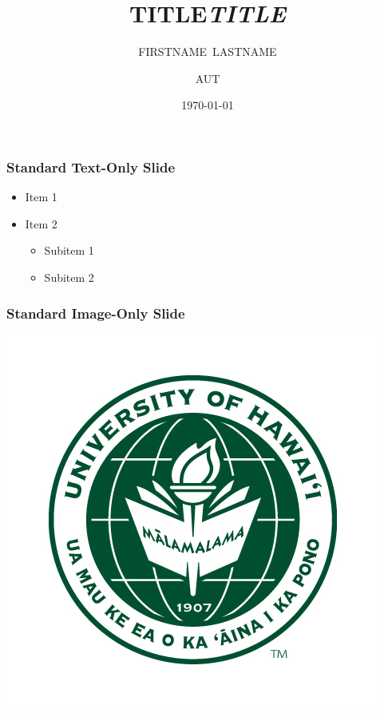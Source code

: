 \documentclass[table]{beamer}
\title{TITLE}
\author{FIRSTNAME~LASTNAME}%
\institute{University of Hawai`i at M\={a}noa}
\date{\today}
\begin{document}
\newcommand{\ibd}{inverse beta decay (IBD)\renewcommand{\ibd}{IBD}}
\newcommand{\nb}{\textcolor{darkgreen}{$\bar{\nu_e}$}}

{
 \begin{frame}
  \titlepage
 \end{frame}
}

\title{\textit{TITLE}}
\author{AUT}




\begin{frame}
  \frametitle{Standard Text-Only Slide}
  \begin{itemize}
    \item Item 1
    \item Item 2
    \begin{itemize}
      \item Subitem 1
      \item Subitem 2
    \end{itemize}
  \end{itemize}
\end{frame}

\begin{frame}
  \frametitle{Standard Image-Only Slide}
  \centering
  \includegraphics[width=0.7\linewidth]{seal.jpg} %
\end{frame}
\end{document}

